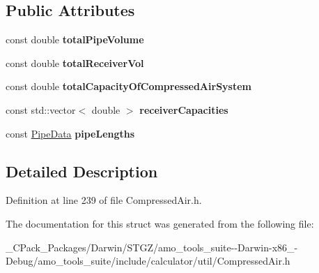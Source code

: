 \subsection*{Public Attributes}
\begin{DoxyCompactItemize}
\item 
\mbox{\label{struct_compressor_1_1_air_system_capacity_1_1_output_aa6eebf63d38ed5cb2943e6ef0d00d326}} 
const double {\bfseries total\+Pipe\+Volume}
\item 
\mbox{\label{struct_compressor_1_1_air_system_capacity_1_1_output_a442171a72537e1c9057f03db3f08a39a}} 
const double {\bfseries total\+Receiver\+Vol}
\item 
\mbox{\label{struct_compressor_1_1_air_system_capacity_1_1_output_a9f81c36e0dfea5574d2e6279b928e288}} 
const double {\bfseries total\+Capacity\+Of\+Compressed\+Air\+System}
\item 
\mbox{\label{struct_compressor_1_1_air_system_capacity_1_1_output_a4636965433b7e3c0fa5ef6d2a69a32ba}} 
const std\+::vector$<$ double $>$ {\bfseries receiver\+Capacities}
\item 
\mbox{\label{struct_compressor_1_1_air_system_capacity_1_1_output_a1a2fe0406a4ff682d7141df7b5e4b150}} 
const \hyperlink{struct_compressor_1_1_pipe_data}{Pipe\+Data} {\bfseries pipe\+Lengths}
\end{DoxyCompactItemize}


\subsection{Detailed Description}


Definition at line 239 of file Compressed\+Air.\+h.



The documentation for this struct was generated from the following file\+:\begin{DoxyCompactItemize}
\item 
\+\_\+\+C\+Pack\+\_\+\+Packages/\+Darwin/\+S\+T\+G\+Z/amo\+\_\+tools\+\_\+suite-\/-\/\+Darwin-\/x86\+\_-\/\+Debug/amo\+\_\+tools\+\_\+suite/include/calculator/util/Compressed\+Air.\+h\end{DoxyCompactItemize}
